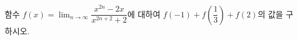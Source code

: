 함수 $f(x)=\displaystyle\lim_{n\to\infty}\dfrac{x^{2n}-2x}{x^{2n+2}+2}$에 대하여 $f(-1)+f\left(\dfrac{1}{3}\right)+f(2)$의 값을 구하시오. 
